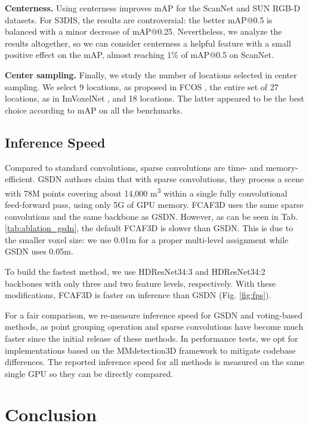 \documentclass[runningheads]{llncs}
\begin{document}
\textbf{Centerness.} Using centerness improves mAP for the ScanNet and SUN RGB-D datasets. For S3DIS, the results are controversial: the better mAP@0.5 is balanced with a minor decrease of mAP@0.25. Nevertheless, we analyze the results altogether, so we can consider centerness a helpful feature with a small positive effect on the mAP, almost reaching 1\% of mAP@0.5 on ScanNet.

\textbf{Center sampling.} Finally, we study the number of locations selected in center sampling. We select 9 locations, as proposed in FCOS \cite{tian2019fcos}, the entire set of 27 locations, as in ImVoxelNet \cite{rukhovich2021imvoxelnet}, and 18 locations. The latter appeared to be the best choice according to mAP on all the benchmarks.

\subsection{Inference Speed}

Compared to standard convolutions, sparse convolutions are time- and memory-efficient. GSDN authors claim that with sparse convolutions, they process a scene with 78M points covering about 14,000 m\textsuperscript{3} within a single fully convolutional feed-forward pass, using only 5G of GPU memory. FCAF3D uses the same sparse convolutions and the same backbone as GSDN. However, as can be seen in Tab. \ref{tab:ablation_gsdn}, the default FCAF3D is slower than GSDN. This is due to the smaller voxel size: we use 0.01m for a proper multi-level assignment while GSDN uses 0.05m.

To build the fastest method, we use HDResNet34:3 and HDResNet34:2 backbones with only three and two feature levels, respectively. With these modifications, FCAF3D is faster on inference than GSDN (Fig. \ref{fig:fps}). 

For a fair comparison, we re-measure inference speed for GSDN and voting-based methods, as point grouping operation and sparse convolutions have become much faster since the initial release of these methods. In performance tests, we opt for implementations based on the MMdetection3D \cite{2020mmdetection3d} framework to mitigate codebase differences. The reported inference speed for all methods is measured on the same single GPU so they can be directly compared.

\section{Conclusion}
\end{document}
